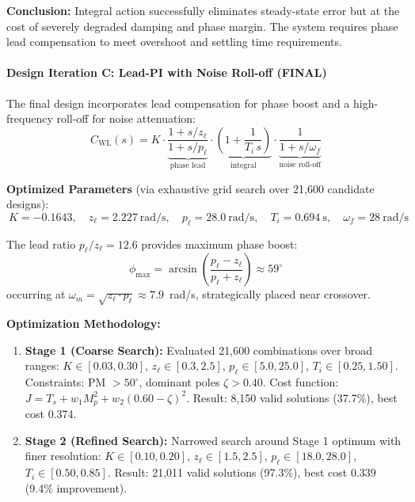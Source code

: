 \textbf{Conclusion:} Integral action successfully eliminates steady-state error but at the cost of severely degraded damping and phase margin. The system requires phase lead compensation to meet overshoot and settling time requirements.

\paragraph{Design Iteration C: Lead-PI with Noise Roll-off (FINAL)}

The final design incorporates lead compensation for phase boost and a high-frequency roll-off for noise attenuation:
\begin{equation}
C_{\mathrm{WL}}(s) = K \cdot \underbrace{\frac{1 + s/z_\ell}{1 + s/p_\ell}}_{\text{phase lead}} \cdot \underbrace{\left(1 + \frac{1}{T_i\,s}\right)}_{\text{integral}} \cdot \underbrace{\frac{1}{1 + s/\omega_f}}_{\text{noise roll-off}}
\label{eq:design_C}
\end{equation}

\textbf{Optimized Parameters} (via exhaustive grid search over 21,600 candidate designs):
\begin{equation}
\boxed{~
K = -0.1643,\quad
z_\ell = 2.227~\text{rad/s},\quad
p_\ell = 28.0~\text{rad/s},\quad
T_i = 0.694~\text{s},\quad
\omega_f = 28~\text{rad/s}
~}
\label{eq:final_params}
\end{equation}

The lead ratio $p_\ell/z_\ell = 12.6$ provides maximum phase boost:
\[
\phi_{\max} = \arcsin\left(\frac{p_\ell - z_\ell}{p_\ell + z_\ell}\right) \approx 59^\circ
\]
occurring at $\omega_m = \sqrt{z_\ell \cdot p_\ell} \approx 7.9$~rad/s, strategically placed near crossover.

\textbf{Optimization Methodology:}
\begin{enumerate}
\item \textbf{Stage 1 (Coarse Search):} Evaluated 21,600 combinations over broad ranges: $K \in [0.03,0.30]$, $z_\ell \in [0.3,2.5]$, $p_\ell \in [5.0,25.0]$, $T_i \in [0.25,1.50]$. Constraints: PM $>50^\circ$, dominant poles $\zeta > 0.40$. Cost function: $J = T_s + w_1 M_p^2 + w_2(0.60-\zeta)^2$. Result: 8,150 valid solutions (37.7\%), best cost 0.374.

\item \textbf{Stage 2 (Refined Search):} Narrowed search around Stage 1 optimum with finer resolution: $K \in [0.10,0.20]$, $z_\ell \in [1.5,2.5]$, $p_\ell \in [18.0,28.0]$, $T_i \in [0.50,0.85]$. Result: 21,011 valid solutions (97.3\%), best cost 0.339 (9.4\% improvement).
\end{enumerate}

